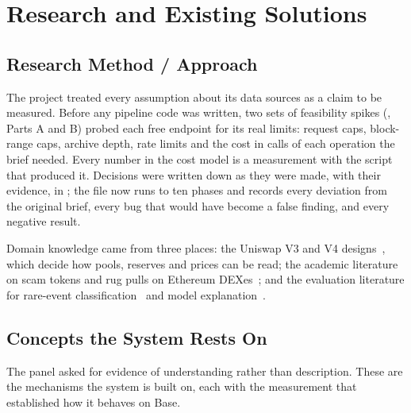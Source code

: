 \chapter{Research and Existing Solutions}
\label{ch:research}

\section{Research Method / Approach}
The project treated every assumption about its data sources as a claim to be measured. Before any pipeline code was written, two sets of feasibility spikes (, Parts A and B) probed each free endpoint for its real limits: request caps, block-range caps, archive depth, rate limits and the cost in calls of each operation the brief needed. Every number in the cost model is a measurement with the script that produced it. Decisions were written down as they were made, with their evidence, in ; the file now runs to ten phases and records every deviation from the original brief, every bug that would have become a false finding, and every negative result.

Domain knowledge came from three places: the Uniswap V3 and V4 designs~\cite{uniswapv4}, which decide how pools, reserves and prices can be read; the academic literature on scam tokens and rug pulls on Ethereum DEXes~\cite{xia2021,mazorra2022,cernera2023}; and the evaluation literature for rare-event classification~\cite{saito2015,king2001,platt1999} and model explanation~\cite{lundberg2017,lundberg2020}.

\section{Concepts the System Rests On}
\label{sec:concepts}
The panel asked for evidence of understanding rather than description. These are the mechanisms the system is built on, each with the measurement that established how it behaves on Base.

